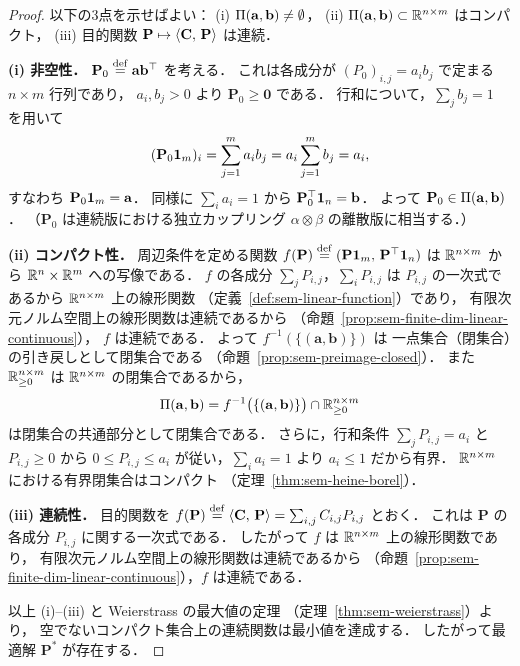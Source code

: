 \begin{proof}
  以下の3点を示せばよい：
  (i) $\Pi(\mathbf{a}, \mathbf{b}) \neq \emptyset$，
  (ii) $\Pi(\mathbf{a}, \mathbf{b}) \subset \mathbb{R}^{n \times m}$ はコンパクト，
  (iii) 目的関数 $\mathbf{P} \mapsto \langle \mathbf{C},\, \mathbf{P} \rangle$ は連続．

  \textbf{(i) 非空性．}
  $\mathbf{P}_0 \overset{\mathrm{def}}{=} \mathbf{a}\mathbf{b}^\top$ を考える．
  これは各成分が $(P_0)_{i,j} = a_i b_j$ で定まる $n \times m$ 行列であり，
  $a_i, b_j > 0$ より $\mathbf{P}_0 \geq \mathbf{0}$ である．
  行和について，$\sum_j b_j = 1$ を用いて
  \[
    (\mathbf{P}_0 \mathbf{1}_m)_i
    = \sum_{j=1}^m a_i b_j
    = a_i \sum_{j=1}^m b_j
    = a_i,
  \]
  すなわち $\mathbf{P}_0 \mathbf{1}_m = \mathbf{a}$．
  同様に $\sum_i a_i = 1$ から $\mathbf{P}_0^\top \mathbf{1}_n = \mathbf{b}$．
  よって $\mathbf{P}_0 \in \Pi(\mathbf{a}, \mathbf{b})$．
  （$\mathbf{P}_0$ は連続版における独立カップリング $\alpha \otimes \beta$
  の離散版に相当する．）

  \textbf{(ii) コンパクト性．}
  周辺条件を定める関数
  $f(\mathbf{P}) \overset{\mathrm{def}}{=} (\mathbf{P}\mathbf{1}_m,\, \mathbf{P}^\top \mathbf{1}_n)$
  は $\mathbb{R}^{n \times m}$ から $\mathbb{R}^n \times \mathbb{R}^m$ への写像である．
  $f$ の各成分 $\sum_j P_{i,j}$，$\sum_i P_{i,j}$ は
  $P_{i,j}$ の一次式であるから $\mathbb{R}^{n \times m}$ 上の線形関数
  （定義~\ref{def:sem-linear-function}）であり，
  有限次元ノルム空間上の線形関数は連続であるから
  （命題~\ref{prop:sem-finite-dim-linear-continuous}），
  $f$ は連続である．
  よって $f^{-1}(\{(\mathbf{a}, \mathbf{b})\})$ は
  一点集合（閉集合）の引き戻しとして閉集合である
  （命題~\ref{prop:sem-preimage-closed}）．
  また $\mathbb{R}_{\geq 0}^{n \times m}$ は $\mathbb{R}^{n \times m}$ の閉集合であるから，
  \[
    \Pi(\mathbf{a}, \mathbf{b})
    = f^{-1}\bigl(\{(\mathbf{a}, \mathbf{b})\}\bigr)
      \cap \mathbb{R}_{\geq 0}^{n \times m}
  \]
  は閉集合の共通部分として閉集合である．
  さらに，行和条件 $\sum_j P_{i,j} = a_i$ と $P_{i,j} \geq 0$ から
  $0 \leq P_{i,j} \leq a_i$ が従い，$\sum_i a_i = 1$ より $a_i \leq 1$ だから有界．
  $\mathbb{R}^{n \times m}$ における有界閉集合はコンパクト
  （定理~\ref{thm:sem-heine-borel}）．

  \textbf{(iii) 連続性．}
  目的関数を $f(\mathbf{P}) \overset{\mathrm{def}}{=} \langle \mathbf{C},\, \mathbf{P} \rangle = \sum_{i,j} C_{i,j} P_{i,j}$ とおく．
  これは $\mathbf{P}$ の各成分 $P_{i,j}$ に関する一次式である．
  したがって $f$ は $\mathbb{R}^{n \times m}$ 上の線形関数であり，
  有限次元ノルム空間上の線形関数は連続であるから
  （命題~\ref{prop:sem-finite-dim-linear-continuous}），$f$ は連続である．

  以上 (i)--(iii) と Weierstrass の最大値の定理
  （定理~\ref{thm:sem-weierstrass}）より，
  空でないコンパクト集合上の連続関数は最小値を達成する．
  したがって最適解 $\mathbf{P}^*$ が存在する．
\end{proof}

